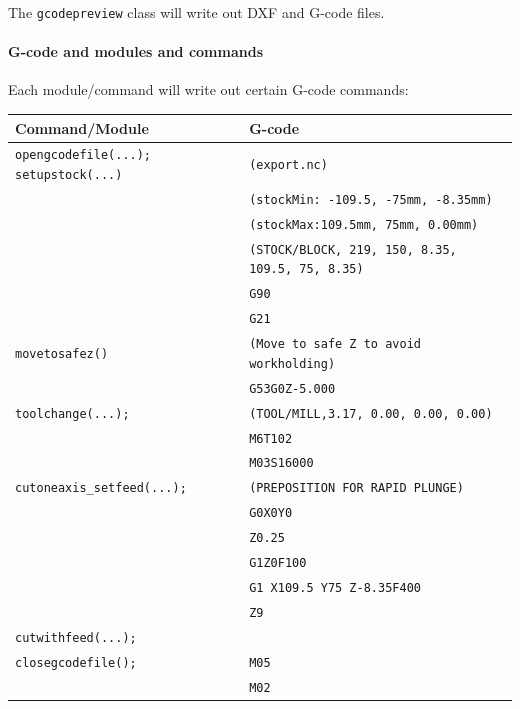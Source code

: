 \documentclass{ltxdoc}
\begin{document}
The \verb|gcodepreview| class will write out DXF and G-code files.

\paragraph{G-code and modules and commands}
 
Each module/command will write out certain G-code commands:

\bigskip

\noindent \begin{tabular}{@{}ll@{}} \toprule
 Command/Module                    & G-code                                        \\ \midrule
 \texttt{opengcodefile(...);}
 \texttt{setupstock(...)}          & \texttt{(export.nc)}                          \\
                                   & \texttt{(stockMin: -109.5, -75mm, -8.35mm)}\\
                                   & \texttt{(stockMax:109.5mm, 75mm, 0.00mm)}\\
                                   & \texttt{(STOCK/BLOCK, 219, 150, 8.35, 109.5, 75, 8.35)}\\
                                   & \texttt{G90}\\
                                   & \texttt{G21} \\ \midrule
 \texttt{movetosafez()}            & \texttt{(Move to safe Z to avoid workholding)}\\
                                   & \texttt{G53G0Z-5.000}\\ \midrule
 \texttt{toolchange(...);}         & \texttt{(TOOL/MILL,3.17, 0.00, 0.00, 0.00)} \\
                                   & \texttt{M6T102} \\
                                   & \texttt{M03S16000} \\ \midrule
 \verb|cutoneaxis_setfeed(...);|   & \texttt{(PREPOSITION FOR RAPID PLUNGE)}\\
  & \texttt{G0X0Y0} \\
  & \texttt{Z0.25} \\
  & \texttt{G1Z0F100} \\
  & \texttt{G1 X109.5 Y75 Z-8.35F400} \\
  & \texttt{Z9}\\
 \texttt{cutwithfeed(...);}\\ \midrule

 \texttt{closegcodefile();}        & \texttt{M05}\\
                                   & \texttt{M02}\\ 
\bottomrule
\end{tabular}
\bigskip
\end{document}
